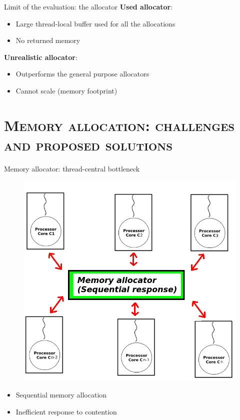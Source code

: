 \documentclass[xcolor=x11names,compress]{beamer}
\renewcommand{\(}{\begin{columns}}
\renewcommand{\)}{\end{columns}}
\newcommand{\<}[1]{\begin{column}{#1}}
\renewcommand{\>}{\end{column}}
\begin{document}

\begin{frame}{Limit of the evaluation: the allocator}
	\textbf{Used allocator}: 
	\begin{itemize}
		\item Large thread-local buffer used for all the allocations
		\item No returned memory
	\end{itemize}

	\textbf{Unrealistic allocator}: 
	\begin{itemize}
		\item Outperforms the general purpose allocators
        \item Cannot scale (memory footprint)
	\end{itemize}
\end{frame}



\section{\scshape Memory allocation: challenges and proposed solutions}
\frame{\tableofcontents[currentsection]}











\begin{frame}{Memory allocator:  thread-central bottleneck}
	\begin{figure}
		\includegraphics[width=0.5\linewidth]{charts/bottleneck.png}
	\end{figure}

	\begin{itemize}
		\item Sequential memory allocation
        \item Inefficient response to contention
	\end{itemize}
\end{frame}
\end{document}
